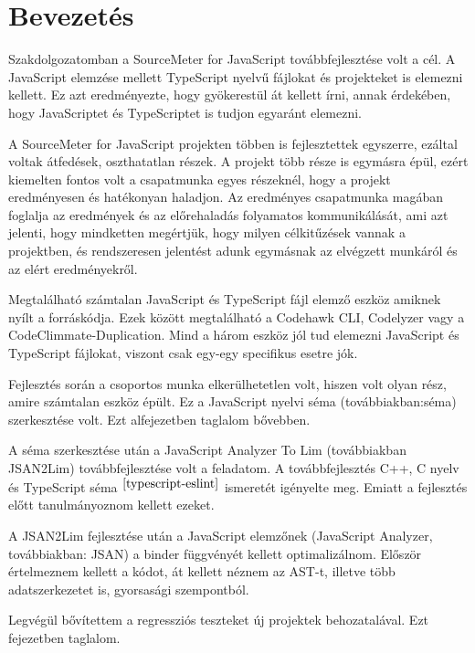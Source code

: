 \chapter{Bevezetés}

\noindent

Szakdolgozatomban a SourceMeter for JavaScript továbbfejlesztése volt a cél.
A JavaScript elemzése mellett TypeScript nyelvű fájlokat és projekteket is elemezni kellett.
Ez azt eredményezte, hogy gyökerestül át kellett írni, annak érdekében,
hogy JavaScriptet és TypeScriptet is tudjon egyaránt elemezni.

\noindent

A SourceMeter for JavaScript projekten többen is fejlesztettek egyszerre, ezáltal voltak átfedések, oszthatatlan részek.
A projekt több része is egymásra épül, ezért kiemelten fontos volt a csapatmunka egyes részeknél, hogy a projekt eredményesen és hatékonyan haladjon.
Az eredményes csapatmunka magában foglalja az eredmények és az előrehaladás folyamatos kommunikálását,
ami azt jelenti, hogy mindketten megértjük, hogy milyen célkitűzések vannak a projektben,
és rendszeresen jelentést adunk egymásnak az elvégzett munkáról és az elért eredményekről.

\noindent

Megtalálható számtalan JavaScript és TypeScript fájl elemző eszköz amiknek nyílt a forráskódja.
Ezek között megtalálható a Codehawk CLI, Codelyzer vagy a CodeClimmate-Duplication.
Mind a három eszköz jól tud elemezni JavaScript és TypeScript fájlokat, viszont csak egy-egy specifikus esetre jók.

\noindent

Fejlesztés során a csoportos munka elkerülhetetlen volt, hiszen volt olyan rész, amire számtalan eszköz épült.
Ez a JavaScript nyelvi séma (továbbiakban:séma) szerkesztése volt. Ezt  alfejezetben taglalom bővebben.

\noindent

A séma szerkesztése után a JavaScript Analyzer To Lim (továbbiakban JSAN2Lim) továbbfejlesztése volt a feladatom.
A továbbfejlesztés C++, C nyelv és TypeScript séma$^{~\cite{typescript-eslint}}$ ismeretét igényelte meg.
Emiatt a fejlesztés előtt tanulmányoznom kellett ezeket.

\noindent

A JSAN2Lim fejlesztése után a JavaScript elemzőnek (JavaScript Analyzer, továbbiakban: JSAN) a binder függvényét kellett optimalizálnom.
Először értelmeznem kellett a kódot, át kellett néznem az AST-t, illetve több adatszerkezetet is, gyorsasági szempontból.

\noindent

Legvégül bővítettem a regressziós teszteket új projektek behozatalával. Ezt  fejezetben taglalom.
